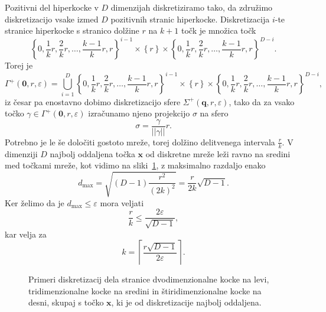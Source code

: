 Pozitivni del hiperkocke v $D$ dimenzijah diskretiziramo tako, da združimo diskretizacijo vsake izmed $D$ pozitivnih stranic hiperkocke. Diskretizacija $i$-te stranice hiperkocke s stranico dolžine $r$ na $k+1$ točk je množica točk 
\[
\left\{0, \frac{1}{k}r, \frac{2}{k}r, \dots, \frac{k-1}{k}r, r\right\}^{i-1} \times \left\{ r \right\} \times \left\{0, \frac{1}{k}r, \frac{2}{k}r, \dots, \frac{k-1}{k}r, r\right\}^{D-i}.
\]
Torej je
\[
\Gamma^+(\textbf{0}, r, \varepsilon) = \bigcup_{i=1}^D \left\{0, \frac{1}{k}r, \frac{2}{k}r, \dots, \frac{k-1}{k}r, r\right\}^{i-1} \times \left\{ r \right\} \times \left\{0, \frac{1}{k}r, \frac{2}{k}r, \dots, \frac{k-1}{k}r, r\right\}^{D-i},
\]
iz česar pa enostavno dobimo diskretizacijo sfere $\Sigma^+(\textbf{q}, r, \varepsilon)$, tako da za vsako točko $\gamma \in \Gamma^+(\textbf{0}, r, \varepsilon)$ izračunamo njeno projekcijo $\sigma$ na sfero 
\[
\sigma = \frac{\gamma}{|| \gamma ||} r.
\]
Potrebno je le še določiti gostoto mreže, torej dolžino delitvenega intervala $\frac{r}{k}$. V dimenziji $D$ najbolj oddaljena točka $\textbf{x}$ od diskretne mreže leži ravno na sredini med točkami mreže, kot vidimo na sliki~\ref{fig:proof_h}, z maksimalno razdaljo enako 
\[
d_{\max} = \sqrt{(D-1)\frac{r^2}{(2k)^2}} = \frac{r}{2k}\sqrt{D-1}.
\]
Ker želimo da je $d_{\max} \leq \varepsilon$ mora veljati 
\[
\frac{r}{k} \leq \frac{2\varepsilon}{\sqrt{D-1}},
\]
kar velja za
\[
k = \left\lceil \frac{r \sqrt{D-1}}{2\varepsilon} \right\rceil.
\]
\begin{figure}[ht]
    \begin{subfigure}{0.32\textwidth}
        \centering
        
    \end{subfigure}
    \hfill
    \begin{subfigure}{0.32\textwidth}
        \centering
        
    \end{subfigure}
    \hfill
    \begin{subfigure}{0.32\textwidth}
        \centering
        
    \end{subfigure}
    \caption{Primeri diskretizacij dela stranice dvodimenzionalne kocke na levi, tridimenzionalne kocke na sredini in štiridimenzionalne kocke na desni, skupaj s točko $\textbf{x}$, ki je od diskretizacije najbolj oddaljena.}
    \label{fig:proof_h}
\end{figure}

